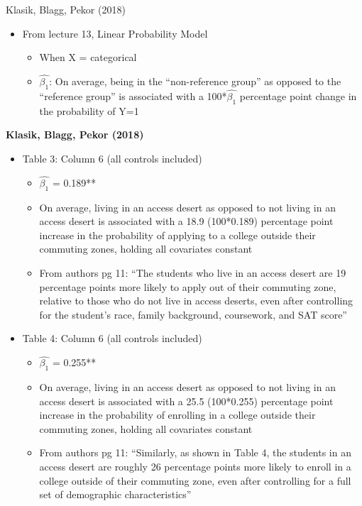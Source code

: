 \documentclass[8pt,ignorenonframetext,dvipsnames]{beamer}
\providecommand{\tightlist}{%
  \setlength{\itemsep}{0pt}\setlength{\parskip}{0pt}}
\renewcommand{\textbf}[1]{{\color{darkgray}\bfseries\fontfamily{Montserrat-TOsF}#1}}
\let\olditem\item
\renewcommand{\item}{%
  \olditem\vspace{4pt}
}
\begin{document}
\begin{frame}{Klasik, Blagg, Pekor (2018)}
\protect\hypertarget{klasik-blagg-pekor-2018-3}{}

\begin{itemize}
\tightlist
\item
  From lecture 13, Linear Probability Model

  \begin{itemize}
  \tightlist
  \item
    When X = categorical
  \item
    \(\hat{\beta_1}\): On average, being in the ``non-reference group''
    as opposed to the ``reference group'' is associated with a
    100*\(\hat{\beta_1}\) percentage point change in the probability of
    Y=1
  \end{itemize}
\end{itemize}

\textbf{Klasik, Blagg, Pekor (2018)}

\begin{itemize}
\item
  Table 3: Column 6 (all controls included)

  \begin{itemize}
  \tightlist
  \item
    \(\hat{\beta_1}\) = 0.189**
  \item
    On average, living in an access desert as opposed to not living in
    an access desert is associated with a 18.9 (100*0.189) percentage
    point increase in the probability of applying to a college outside
    their commuting zones, holding all covariates constant
  \item
    From authors pg 11: ``The students who live in an access desert are
    19 percentage points more likely to apply out of their commuting
    zone, relative to those who do not live in access deserts, even
    after controlling for the student's race, family background,
    coursework, and SAT score''
  \end{itemize}
\item
  Table 4: Column 6 (all controls included)

  \begin{itemize}
  \tightlist
  \item
    \(\hat{\beta_1}\) = 0.255**
  \item
    On average, living in an access desert as opposed to not living in
    an access desert is associated with a 25.5 (100*0.255) percentage
    point increase in the probability of enrolling in a college outside
    their commuting zones, holding all covariates constant
  \item
    From authors pg 11: ``Similarly, as shown in Table 4, the students
    in an access desert are roughly 26 percentage points more likely to
    enroll in a college outside of their commuting zone, even after
    controlling for a full set of demographic characteristics''
  \end{itemize}
\end{itemize}

\end{frame}
\end{document}
